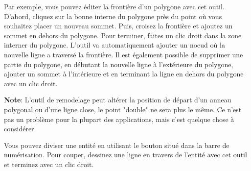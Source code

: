Par exemple, vous pouvez éditer la frontière d'un polygone avec cet outil. D'abord, 
cliquez sur la bonne interne du polygone près du point où vous souhaitez placer 
un nouveau sommet. Puis, croisez la frontière et ajoutez un sommet en dehors du 
polygone. Pour terminer, faites un clic droit dans la zone interner du polygone. 
L'outil va automatiquement ajouter un noeud où la nouvelle ligne a traversé la 
frontière. Il est également possible de supprimer une partie du polygone, en 
débutant la nouvelle ligne à l'extérieure du polygone, ajouter un sommet à 
l'intérieure et en terminant la ligne en dehors du polygone avec un clic droit.
 
\textbf{Note}: L'outil de remodelage peut altérer la position de départ d'un 
anneau polygonal ou d'une ligne close, le point "double" ne sera plus le même. 
Ce n'est pas un problème pour la plupart des applications, mais c'est quelque 
chose à considérer.


Vous pouvez diviser une entité en utilisant le bouton  situé dans la barre de numérisation. Pour couper, dessinez une ligne en travers de l'entité avec cet outil et terminez avec un clic droit.


